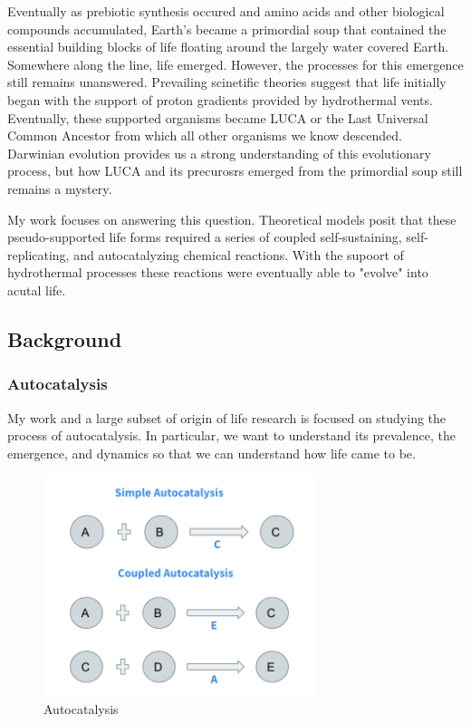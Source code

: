 \documentclass[11pt]{article}
\begin{document}
Eventually as prebiotic synthesis occured and amino acids and other biological compounds accumulated, Earth's became a primordial soup that contained the essential building blocks of life floating around the largely water covered Earth.
Somewhere along the line, life emerged. However, the processes for this emergence still remains unanswered.
Prevailing scinetific theories suggest that life initially began with the support of proton gradients provided by hydrothermal vents.
Eventually, these supported organisms became LUCA or the Last Universal Common Ancestor from which all other organisms we know descended.  
Darwinian evolution provides us a strong understanding of this evolutionary process, but how LUCA and its precurosrs emerged from the primordial soup still remains a mystery.

My work focuses on answering this question. Theoretical models posit that these pseudo-supported life forms required a series of coupled self-sustaining, self-replicating, and autocatalyzing chemical reactions.
With the supoort of hydrothermal processes these reactions were eventually able to "evolve" into acutal life. 



\subsection{Background}

\subsubsection*{Autocatalysis}
My work and a large subset of origin of life research is focused on studying the process of autocatalysis. In particular, we want to understand its prevalence, the emergence, and dynamics so that we can understand how life came to be.

\begin{figure}[H]
    \centering
\includegraphics[width=8cm]{autocatalysis}
\caption{Autocatalysis}

\end{figure}
\end{document}
